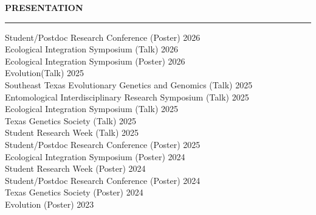 \documentclass[11pt, a4paper]{article}
\begin{document}
\begin{center}
\textbf{PRESENTATION }\\
\vspace{-0.8em}
\noindent\rule{\linewidth}{0.4pt}

\noindent Student/Postdoc Research Conference (Poster) \hfill 2026 \\ %
\noindent  Ecological Integration Symposium (Talk) \hfill 2026 \\ %
\noindent  Ecological Integration Symposium (Poster) \hfill 2026 \\ %
\noindent Evolution(Talk) \hfill 2025 \\  %
\noindent  Southeast Texas Evolutionary Genetics and Genomics (Talk) \hfill 2025 \\
\noindent  Entomological Interdisciplinary Research Symposium (Talk) \hfill 2025 \\ 
\noindent  Ecological Integration Symposium (Talk) \hfill 2025 \\
\noindent  Texas Genetics Society (Talk) \hfill 2025 \\ %
\noindent Student Research Week (Talk) \hfill 2025 \\ 
\noindent Student/Postdoc Research Conference (Poster) \hfill 2025 \\ %
\noindent Ecological Integration Symposium (Poster) \hfill 2024 \\
\noindent  Student Research Week (Poster) \hfill 2024 \\
\noindent  Student/Postdoc Research Conference (Poster) \hfill 2024 \\ %
\noindent  Texas Genetics Society (Poster) \hfill 2024 \\
\noindent  Evolution (Poster) \hfill 2023 \\ %
\vspace{+0.5em}
   

\end{center}
\end{document}
